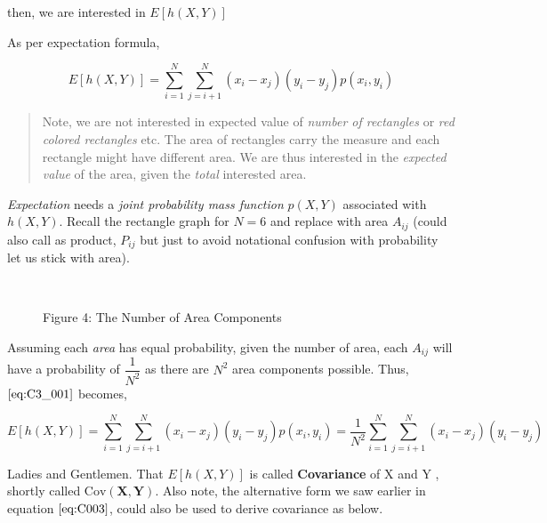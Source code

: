 \documentclass[float=false,crop=false]{standalone}
\begin{document}
then, we are interested in \(E[h(X,Y)]\)

As per expectation formula,

\begin{equation}
E[h(X,Y)] =  \sum\limits_{i=1}^N\sum\limits_{j=i+1}^{N}(x_i - x_j)(y_i - y_j)p(x_i , y_i) \label{eq:C3_001}
\end{equation}

\begin{quote}
Note, we are not interested in expected value of \emph{number of
rectangles} or \emph{red colored rectangles} etc. The area of rectangles
carry the measure and each rectangle might have different area. We are
thus interested in the \emph{expected value} of the area, given the
\emph{total} interested area.
\end{quote}

\emph{Expectation} needs a \emph{joint probability mass function}
\(p(X,Y)\) associated with \(h(X,Y)\). Recall the rectangle graph for
\(N=6\) and replace with area \(A_{ij}\) (could also call as product,
\(P_{ij}\) but just to avoid notational confusion with probability let
us stick with area).
    ~

\begin{figure}
\centering%
    \begin{center}
    \end{center}
    { \hspace*{\fill} \\}
    \caption{Figure 4: The Number of Area Components} \label{fig:C3_004}
\end{figure}
    Assuming each \emph{area} has equal probability, given the number of
area, each \(A_{ij}\) will have a probability of \(\dfrac{1}{N^2}\) as
there are \(N^2\) area components possible. Thus, \(\ref{eq:C3_001}\)
becomes,

    \begin{equation}
E[h(X,Y)] =  \sum\limits_{i=1}^N\sum\limits_{j=i+1}^{N}(x_i - x_j)(y_i - y_j)p(x_i , y_i) =  \dfrac{1}{N^2}\sum\limits_{i=1}^N\sum\limits_{j=i+1}^{N}(x_i - x_j)(y_i - y_j) \label{eq:C3_002}
\end{equation}

    Ladies and Gentlemen. That \(E[h(X,Y)]\) is called \textbf{Covariance}
of X and Y , shortly called \(\mathbf{\mathrm{Cov}(X,Y)}\). Also note,
the alternative form we saw earlier in equation \(\ref{eq:C003}\), could
also be used to derive covariance as below.
\end{document}
